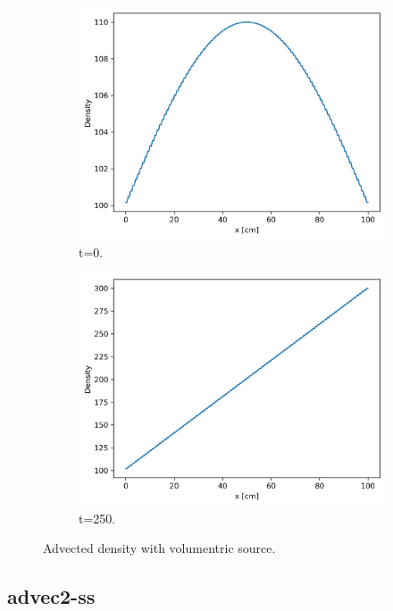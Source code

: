 \documentclass[11pt,letterpaper]{article}
\begin{document}
	\begin{figure}[htbp!]
		\centering
		\begin{subfigure}[t]{0.4\textwidth}
			\centering
			\includegraphics[width=\linewidth]{advec2-t-0}
			\caption{t=0.}
		\end{subfigure}
		\begin{subfigure}[t]{0.4\textwidth}
			\centering
			\includegraphics[width=\linewidth]{advec2-t-251}
			\caption{t=250.}
		\end{subfigure}
		\hfill
		\caption{Advected density with volumentric source.}
		\label{fig:advec2-t}
	\end{figure}

	\subsection{advec2-ss}
\end{document}

